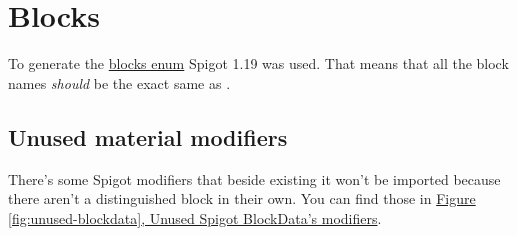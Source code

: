 \section{Blocks}\label{appendix:blocks}
To generate the \hyperref[type:block]{blocks enum} Spigot 1.19 was used.
That means that all the block names \textit{should} be the exact same as \cite{spigot-material}.



\subsection{Unused material modifiers}
There's some Spigot modifiers that beside existing it won't be imported because there aren't a distinguished block in their own. You can find those in \hyperref[fig:unused-blockdata]{Figure \ref{fig:unused-blockdata}, Unused Spigot BlockData's modifiers}.

